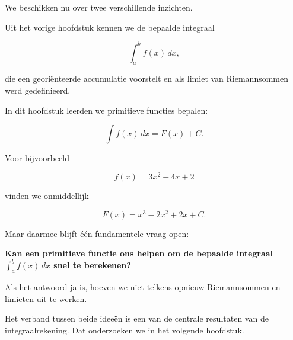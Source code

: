 \documentclass{ximera}
\begin{document}

We beschikken nu over twee verschillende inzichten.

Uit het vorige hoofdstuk kennen we de bepaalde integraal

\[
\int_a^b f(x)\,dx,
\]

die een georiënteerde accumulatie voorstelt en als limiet van
Riemannsommen werd gedefinieerd.

In dit hoofdstuk leerden we primitieve functies bepalen:

\[
\int f(x)\,dx=F(x)+C.
\]

Voor bijvoorbeeld

\[
f(x)=3x^2-4x+2
\]

vinden we onmiddellijk

\[
F(x)=x^3-2x^2+2x+C.
\]

Maar daarmee blijft één fundamentele vraag open:

\begin{center}
\textbf{Kan een primitieve functie ons helpen om de bepaalde integraal
\(\displaystyle\int_a^b f(x)\,dx\) snel te berekenen?}
\end{center}

Als het antwoord ja is, hoeven we niet telkens opnieuw Riemannsommen en
limieten uit te werken.

Het verband tussen beide ideeën is een van de centrale resultaten van
de integraalrekening. Dat onderzoeken we in het volgende hoofdstuk.
\end{document}
